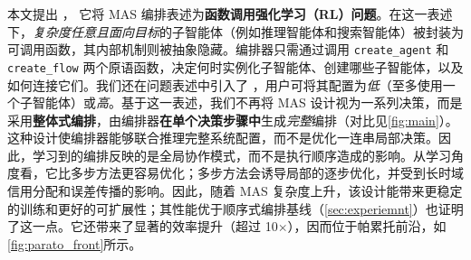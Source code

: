 





本文提出 \textbf{\ourframework}，
它将 MAS 编排表述为\textbf{函数调用强化学习（RL）问题}。在这一表述下，\textit{复杂度任意且面向目标}的子智能体（例如推理智能体和搜索智能体）被封装为可调用函数，其内部机制则被抽象隐藏。编排器只需通过调用 \texttt{create\_agent} 和 \texttt{create\_flow} 两个原语函数，决定何时实例化子智能体、创建哪些子智能体，以及如何连接它们。我们还在问题表述中引入了 \textbf{\masness}，用户可将其配置为\textit{低}（至多使用一个子智能体）或\textit{高}。基于这一表述，我们不再将 MAS 设计视为一系列决策，而是采用\textbf{整体式编排}，由编排器\textbf{在单个决策步骤中}生成\textit{完整}编排（对比见\cref{fig:main}）。
这种设计使编排器能够联合推理完整系统配置，而不是优化一连串局部决策。因此，学习到的编排反映的是全局协作模式，而不是执行顺序造成的影响。从学习角度看，它比多步方法更容易优化；多步方法会诱导局部的逐步优化，并受到长时域信用分配和误差传播的影响。因此，随着 MAS 复杂度上升，该设计能带来更稳定的训练和更好的可扩展性；其性能优于顺序式编排基线（\cref{sec:experiemnt}）也证明了这一点。它还带来了显著的效率提升（超过 10$\times$），因而位于帕累托前沿，如\cref{fig:parato_front}所示。

